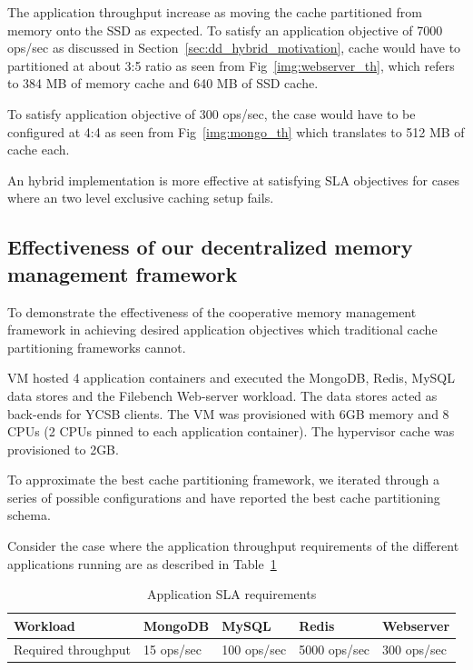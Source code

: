 	The application throughput increase as moving the cache partitioned from memory onto the SSD as expected.
	To satisfy an application objective of 7000 ops/sec as discussed in Section~\ref{sec:dd_hybrid_motivation}, 
	cache would have to partitioned at about 3:5 ratio as seen from Fig~\ref{img:webserver_th}, which refers to 
	384 MB of memory cache and 640 MB of SSD cache. 
	
	To satisfy application objective of 300 ops/sec, the case would have to be configured at 4:4 as seen from 
	Fig~\ref{img:mongo_th} which translates to 512 MB of cache each.
	
	An hybrid implementation is more effective at satisfying SLA objectives for cases where an two level exclusive
	caching setup fails.
	
    \subsection{Effectiveness of our decentralized memory management framework}
      
	To demonstrate the effectiveness of the cooperative memory management framework in achieving desired application 
	objectives which traditional cache partitioning frameworks cannot.
	
	VM hosted 4 application containers and executed the MongoDB, Redis, MySQL data stores and
	the Filebench Web-server workload. The data stores acted as back-ends for YCSB clients. The VM 
	was provisioned with 6GB memory and 8 CPUs (2 CPUs pinned to each application container). 
	The hypervisor cache was provisioned to 2GB.
	
	To approximate the best cache partitioning framework, we iterated through a series of possible 
	configurations and have reported the best cache partitioning schema. 
	
	Consider the case where the application throughput requirements of the different applications running
	are as described in Table~\ref{table:desired_app_throughputs}
	
	    \begin{table}
		\begin{center}
		  \begin{tabular}{ l | l | l | l | l }	      	    
			Workload & MongoDB & MySQL & Redis & Webserver \\ 
		    \hline
			Required throughput & 15 ops/sec & 100 ops/sec & 5000 ops/sec & 300 ops/sec \\		   
		  \end{tabular}
		\caption{Application SLA requirements}
		\label{table:desired_app_throughputs}
		\end{center}	  
	      \end{table}
	  
